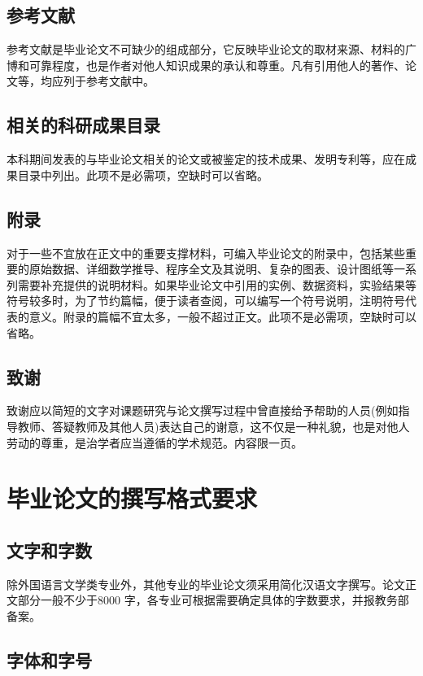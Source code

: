 \subsection{参考文献}

参考文献是毕业论文不可缺少的组成部分，它反映毕业论文的取材来源、材料的广博和可靠程度，也是作者对他人知识成果的承认和尊重。凡有引用他人的著作、论文等，均应列于参考文献中。

\subsection{相关的科研成果目录}

本科期间发表的与毕业论文相关的论文或被鉴定的技术成果、发明专利等，应在成果目录中列出。此项不是必需项，空缺时可以省略。

\subsection{附录}

对于一些不宜放在正文中的重要支撑材料，可编入毕业论文的附录中，包括某些重要的原始数据、详细数学推导、程序全文及其说明、复杂的图表、设计图纸等一系列需要补充提供的说明材料。如果毕业论文中引用的实例、数据资料，实验结果等符号较多时，为了节约篇幅，便于读者查阅，可以编写一个符号说明，注明符号代表的意义。附录的篇幅不宜太多，一般不超过正文。此项不是必需项，空缺时可以省略。

\subsection{致谢}

致谢应以简短的文字对课题研究与论文撰写过程中曾直接给予帮助的人员(例如指导教师、答疑教师及其他人员)表达自己的谢意，这不仅是一种礼貌，也是对他人劳动的尊重，是治学者应当遵循的学术规范。内容限一页。

\section{毕业论文的撰写格式要求}
\subsection{文字和字数}

除外国语言文学类专业外，其他专业的毕业论文须采用简化汉语文字撰写。论文正文部分一般不少于8000 字，各专业可根据需要确定具体的字数要求，并报教务部备案。

\subsection{字体和字号}


